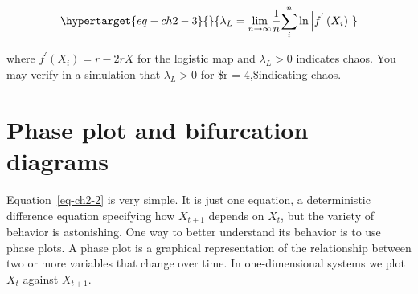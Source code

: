 \documentclass[
  letterpaper,
]{scrbook}
\begin{document}
\begin{equation}\protect\hypertarget{eq-ch2-3}{}{
{\lambda_{L} = \lim_{n \rightarrow \infty}}{\frac{1}{n}}{\sum_{i}^{n}{\ln\left| f^{'}\left( X_{i} \right) \right|}}}\label{eq-ch2-3}\end{equation}

where \(f^{'}\left( X_{i} \right) = r - 2rX\) for the logistic map and
\(\lambda_{L} > 0\) indicates chaos. You may verify in a simulation that
\(\lambda_{L} > 0\) for \$r = 4,\$indicating chaos.

\hypertarget{phase-plot-and-bifurcation-diagrams}{%
\section{Phase plot and bifurcation
diagrams}\label{phase-plot-and-bifurcation-diagrams}}

Equation~\ref{eq-ch2-2} is very simple. It is just one equation, a
deterministic difference equation specifying how \(X_{t + 1}\) depends
on \(X_{t}\), but the variety of behavior is astonishing. One way to
better understand its behavior is to use phase plots. A phase plot is a
graphical representation of the relationship between two or more
variables that change over time. In one-dimensional systems we plot
\(X_{t}\) against \(X_{t + 1}\).
\end{document}

